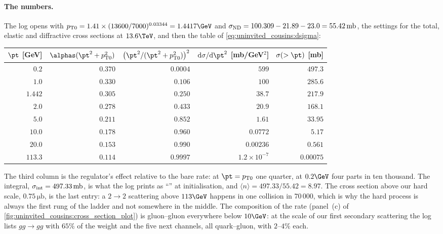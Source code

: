 \paragraph{The numbers.} The  log opens with
$\ptzero=1.41\times(13600/7000)^{0.03344}=1.4417\GeV$ and
$\sigma_{\mathrm{ND}}=100.309-21.89-23.0=55.42\,\mathrm{mb}$, the \CMSSW settings for the
total, elastic and diffractive cross sections at $13.6\TeV$, and then the
table of \cref{eq:uninvited_cousins:dsigma}:
\begin{center}\footnotesize
\begin{tabular}{rrrrr}\toprule
$\pt$ [GeV] & $\alphas(\pt^2+\ptzero^2)$ & $\bigl(\pt^2/(\pt^2+\ptzero^2)\bigr)^2$ & $\mathrm{d}\sigma/\mathrm{d}\pt^2$ [mb/GeV$^2$] & $\sigma(>\pt)$ [mb] \\ \midrule
$0.2$ & $0.370$ & $0.0004$ & $599$ & $497.3$ \\
$1.0$ & $0.330$ & $0.106$ & $100$ & $285.6$ \\
$1.442$ & $0.305$ & $0.250$ & $38.7$ & $217.9$ \\
$2.0$ & $0.278$ & $0.433$ & $20.9$ & $168.1$ \\
$5.0$ & $0.211$ & $0.852$ & $1.61$ & $33.95$ \\
$10.0$ & $0.178$ & $0.960$ & $0.0772$ & $5.17$ \\
$20.0$ & $0.153$ & $0.990$ & $0.00236$ & $0.561$ \\
$113.3$ & $0.114$ & $0.9997$ & $1.2\times10^{-7}$ & $0.00075$ \\
\bottomrule
\end{tabular}
\end{center}
The third column is the regulator's effect relative to the bare rate: at
$\pt=\ptzero$ one quarter, at $0.2\GeV$ four parts in ten thousand. The
integral, $\sigma_{\mathrm{int}}=497.33\,\mathrm{mb}$, is what the \CMSSW log prints as
``'' at
initialisation, and $\langle n\rangle=497.33/55.42=8.97$. The cross section
above our hard scale, $0.75\,\mathrm{\mu b}$, is the last entry: a
$2\to2$ scattering above $113\GeV$ happens in one collision in $70\,000$,
which is why the hard process is always the first rung of the ladder and not
somewhere in the middle. The composition of the rate (panel~(c) of
\cref{fig:uninvited_cousins:cross_section_plot}) is gluon--gluon everywhere
below $10\GeV$: at the scale of our first secondary scattering the log
lists $gg\to gg$ with $65\%$ of the weight and the five next channels, all
quark--gluon, with $2$--$4\%$ each.

